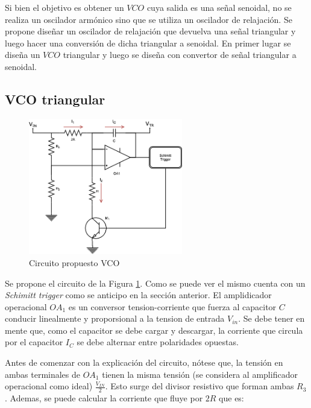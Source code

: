 \documentclass[12pt,a4paper]{article}
\begin{document}
Si bien el objetivo es obtener un $VCO$ cuya salida es una señal senoidal, no se realiza un oscilador armónico sino que se utiliza un oscilador de relajación. Se propone diseñar un oscilador de relajación que devuelva una señal triangular y luego hacer una conversión de dicha triangular a senoidal. En primer lugar se diseña un $VCO$ triangular y luego se diseña con convertor de señal triangular a senoidal. 

\subsection{VCO triangular}


\begin{figure}[h!]                                                       
    \centering\includegraphics[width=0.6\textwidth]{Resources/circuito_propuesto_1.png}
    \caption{Circuito propuesto VCO}
    \label{fig:VCO_circuito_propuesto_1}
    \end{figure}


Se propone el circuito de la Figura \ref{fig:VCO_circuito_propuesto_1}. Como se puede ver el mismo cuenta con un \textit{Schimitt trigger} como se anticipo en la sección anterior. El amplidicador operacional $OA_1$ es un conversor tension-corriente que fuerza al capacitor $C$ conducir linealmente y proporsional a la tension de entrada $V_{in}$. Se debe tener en mente que, como el capacitor se debe cargar y descargar, la corriente que circula por el capacitor $I_C$ se debe alternar entre polaridades opuestas. 

Antes de comenzar con la explicación del circuito, nótese que, la tensión en ambas terminales de $OA_1$ tienen la misma tensión (se considera al amplificador operacional como ideal) $\frac{V_{IN}}{2}$. Esto surge del divisor resistivo que forman ambas $R_3$. Ademas, se puede calcular la corriente que fluye por $2R$ que es:
\end{document}
